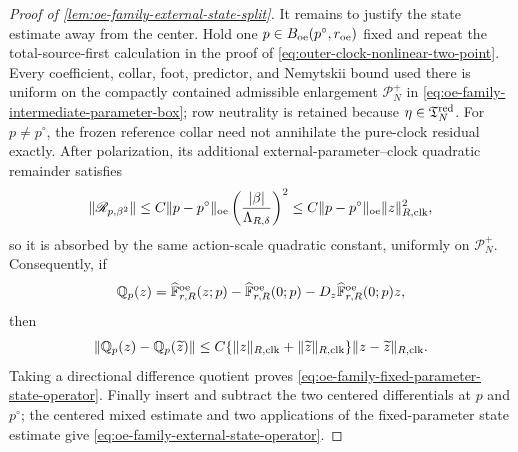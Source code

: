 \begin{proof}[Proof of
\cref{lem:oe-family-external-state-split}]
It remains to justify the state estimate away from the center.  Hold one
\(p\in B_{\rm oe}(p^\circ,r_{\rm oe})\) fixed and repeat the
total-source-first calculation in the proof of
\cref{eq:outer-clock-nonlinear-two-point}.  Every coefficient, collar,
foot, predictor, and Nemytskii bound used there is uniform on the compactly
contained admissible enlargement
\(\mathcal P_N^+\) in
\cref{eq:oe-family-intermediate-parameter-box}; row neutrality is retained
because \(\eta\in\mathfrak T_N^{\rm red}\).  For \(p\ne p^\circ\), the
frozen reference collar need not annihilate the pure-clock residual
exactly.  After polarization, its additional external-parameter--clock
quadratic remainder satisfies
\begin{equation}
 \|\mathscr R_{p,\beta^2}\|
 \le C\|p-p^\circ\|_{\rm oe}
       \left(\frac{|\beta|}{\Lambda_{R,\delta}}\right)^2
 \le C\|p-p^\circ\|_{\rm oe}\|z\|_{R,\rm clk}^2,
                                                        \label{eq:proof-oe-family-parameter-clock-quadratic}
\end{equation}
so it is absorbed by the same action-scale quadratic constant, uniformly
on \(\mathcal P_N^+\).  Consequently, if
\begin{equation*}
 \mathbb Q_p(z)=
 \widehat{\mathbb F}_{r,R}^{\rm oe}(z;p)
 -\widehat{\mathbb F}_{r,R}^{\rm oe}(0;p)
 -D_z\widehat{\mathbb F}_{r,R}^{\rm oe}(0;p)z,
\end{equation*}
then
\begin{equation}
 \|\mathbb Q_p(z)-\mathbb Q_p(\widetilde z)\|
 \le C\{\|z\|_{R,\rm clk}+\|\widetilde z\|_{R,\rm clk}\}
       \|z-\widetilde z\|_{R,\rm clk}.          \label{eq:proof-oe-family-uniform-state-two-point}
\end{equation}
Taking a directional difference quotient proves
\cref{eq:oe-family-fixed-parameter-state-operator}.  Finally insert and
subtract the two centered differentials at \(p\) and \(p^\circ\); the
centered mixed estimate and two applications of the fixed-parameter state
estimate give \cref{eq:oe-family-external-state-operator}.
\end{proof}

